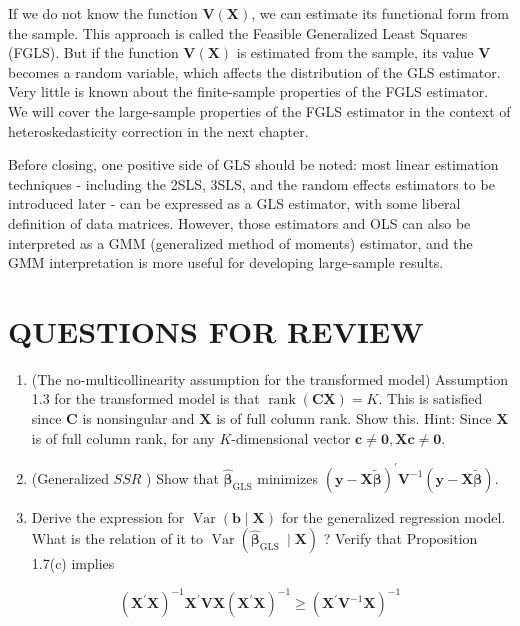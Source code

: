\documentclass[10pt]{article}
\begin{document}
If we do not know the function $\mathbf{V}(\mathbf{X})$, we can estimate its functional form from the sample. This approach is called the Feasible Generalized Least Squares (FGLS). But if the function $\mathbf{V}(\mathbf{X})$ is estimated from the sample, its value $\mathbf{V}$ becomes a random variable, which affects the distribution of the GLS estimator. Very little is known about the finite-sample properties of the FGLS estimator. We will cover the large-sample properties of the FGLS estimator in the context of heteroskedasticity correction in the next chapter.

Before closing, one positive side of GLS should be noted: most linear estimation techniques - including the 2SLS, 3SLS, and the random effects estimators to be introduced later - can be expressed as a GLS estimator, with some liberal definition of data matrices. However, those estimators and OLS can also be interpreted as a GMM (generalized method of moments) estimator, and the GMM interpretation is more useful for developing large-sample results.

\section*{QUESTIONS FOR REVIEW}
\begin{enumerate}
  \item (The no-multicollinearity assumption for the transformed model) Assumption 1.3 for the transformed model is that $\operatorname{rank}(\mathbf{C X})=K$. This is satisfied since $\mathbf{C}$ is nonsingular and $\mathbf{X}$ is of full column rank. Show this. Hint: Since $\mathbf{X}$ is of full column rank, for any $K$-dimensional vector $\mathbf{c} \neq \mathbf{0}, \mathbf{X c} \neq \mathbf{0}$.
  \item (Generalized $S S R$ ) Show that $\widehat{\boldsymbol{\beta}}_{\mathrm{GLS}}$ minimizes $(\mathbf{y}-\mathbf{X} \widetilde{\boldsymbol{\beta}})^{\prime} \mathbf{V}^{-1}(\mathbf{y}-\mathbf{X} \widetilde{\boldsymbol{\beta}})$.
  \item Derive the expression for $\operatorname{Var}(\mathbf{b} \mid \mathbf{X})$ for the generalized regression model. What is the relation of it to $\operatorname{Var}\left(\widehat{\boldsymbol{\beta}}_{\text {GLS }} \mid \mathbf{X}\right)$ ? Verify that Proposition 1.7(c) implies
\end{enumerate}

$$
\left(\mathbf{X}^{\prime} \mathbf{X}\right)^{-1} \mathbf{X}^{\prime} \mathbf{V} \mathbf{X}\left(\mathbf{X}^{\prime} \mathbf{X}\right)^{-1} \geq\left(\mathbf{X}^{\prime} \mathbf{V}^{-1} \mathbf{X}\right)^{-1}
$$
\end{document}
